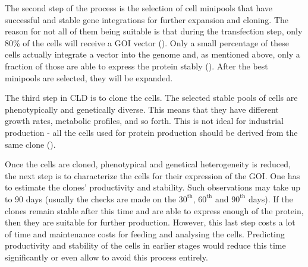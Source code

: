 The second step of the process is the selection of cell minipools that have successful and stable gene integrations for further expansion and cloning. The reason for not all of them being suitable is that during the transfection step, only 80\% of the cells will receive a GOI vector (\cite{Castan_2018}). Only a small percentage of these cells actually integrate a vector into the genome and, as mentioned above, only a fraction of those are able to express the protein stably (\cite{Shin_2020}). After the best minipools are selected, they will be expanded.

The third step in CLD is to clone the cells. The selected stable pools of cells are phenotypically and genetically diverse. This means that they have different growth rates, metabolic profiles, and so forth. This is not ideal for industrial production - all the cells used for protein production should be derived from the same clone (\cite{ema_2020}). 

Once the cells are cloned, phenotypical and genetical heterogeneity is reduced, the next step is to characterize the cells for their expression of the GOI. One has to estimate the clones' productivity and stability. Such observations may take up to 90 days (usually the checks are made on the $30^{\text{th}}$, $60^{\text{th}}$ and $90^{\text{th}}$ days). If the clones remain stable after this time and are able to express enough of the protein, then they are suitable for further production. However, this last step costs a lot of time and maintenance costs for feeding and analysing the cells. Predicting productivity and stability of the cells in earlier stages would reduce this time significantly or even allow to avoid this process entirely.